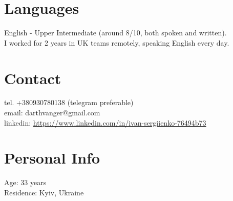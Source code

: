 \documentclass[a4paper, 14pt]{article}
\begin{document}
\section{Languages}
	English - Upper Intermediate (around 8/10, both spoken and written). \\
  I worked for 2 years in UK teams remotely, speaking English every day.

\section{Contact}
	tel. +380930780138 (telegram preferable) \\
	email: darthvanger@gmail.com \\
  linkedin: \url{https://www.linkedin.com/in/ivan-sergiienko-76494b73}

\section{Personal Info}
	Age: 33 years \\
  Residence: Kyiv, Ukraine
\end{document}

